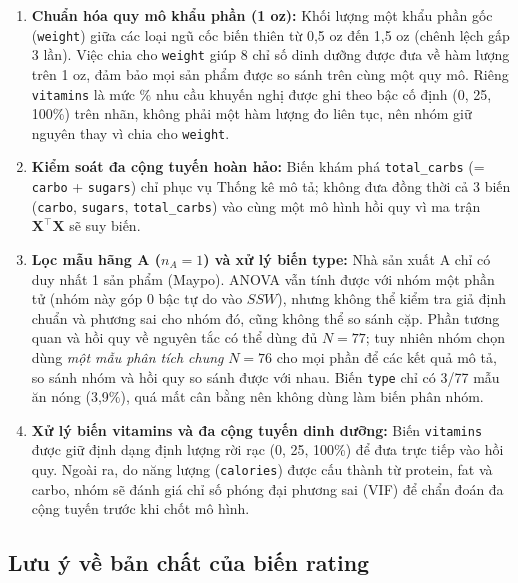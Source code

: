 \documentclass[12pt,a4paper]{article}
\begin{document}
\begin{enumerate}
  \item \textbf{Chuẩn hóa quy mô khẩu phần (1 oz):} Khối lượng một khẩu phần gốc
  (\texttt{weight}) giữa các loại ngũ cốc biến thiên từ 0,5 oz đến 1,5 oz (chênh lệch gấp 3
  lần). Việc chia cho \texttt{weight} giúp 8 chỉ số dinh dưỡng được đưa về hàm lượng trên 1 oz,
  đảm bảo mọi sản phẩm được so sánh trên cùng một quy mô. Riêng \texttt{vitamins} là mức
  \% nhu cầu khuyến nghị được ghi theo bậc cố định (0, 25, 100\%) trên nhãn, không phải một
  hàm lượng đo liên tục, nên nhóm giữ nguyên thay vì chia cho \texttt{weight}.

  \item \textbf{Kiểm soát đa cộng tuyến hoàn hảo:} Biến khám phá
  \texttt{total\_carbs} (= \texttt{carbo} + \texttt{sugars}) chỉ phục vụ Thống kê mô tả;
  không đưa đồng thời cả 3 biến (\texttt{carbo}, \texttt{sugars}, \texttt{total\_carbs}) vào
  cùng một mô hình hồi quy vì ma trận $\mathbf{X}^\top\mathbf{X}$ sẽ suy biến.

  \item \textbf{Lọc mẫu hãng A ($n_A = 1$) và xử lý biến type:} Nhà sản xuất A chỉ có duy
  nhất 1 sản phẩm (Maypo). ANOVA vẫn tính được với nhóm một phần tử (nhóm này góp 0 bậc tự do
  vào $SSW$), nhưng không thể kiểm tra giả định chuẩn và phương sai cho nhóm đó, cũng không
  thể so sánh cặp. Phần tương quan và hồi quy về nguyên tắc có thể dùng đủ $N = 77$; tuy
  nhiên nhóm chọn dùng \emph{một mẫu phân tích chung} $N = 76$ cho mọi phần để các kết quả mô
  tả, so sánh nhóm và hồi quy so sánh được với nhau. Biến \texttt{type} chỉ có 3/77 mẫu ăn
  nóng (3,9\%), quá mất cân bằng nên không dùng làm biến phân nhóm.

  \item \textbf{Xử lý biến vitamins và đa cộng tuyến dinh dưỡng:} Biến \texttt{vitamins}
  được giữ định dạng định lượng rời rạc (0, 25, 100\%) để đưa trực tiếp vào hồi quy. Ngoài
  ra, do năng lượng (\texttt{calories}) được cấu thành từ protein, fat và carbo, nhóm sẽ đánh
  giá chỉ số phóng đại phương sai (VIF) để chẩn đoán đa cộng tuyến trước khi chốt mô hình.
\end{enumerate}

\subsection{Lưu ý về bản chất của biến rating}
\label{sec:rating}
\end{document}
